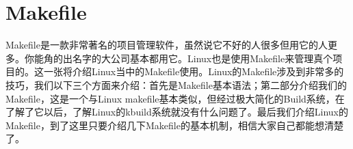 \chapter{Makefile}
Makefile是一款非常著名的项目管理软件，虽然说它不好的人很多但用它的人更多。你能角的出名字的大公司基本都用它。Linux也是使用Makefile来管理真个项目的。这一张将介绍Linux当中的Makefile使用。Linux的Makefile涉及到非常多的技巧，我们以下三个方面来介绍：首先是Makefile基本语法；第二部分介绍我们的Makefile，这是一个与Linux makefile基本类似，但经过极大简化的Build系统，在了解了它以后，了解Linux的kbuild系统就没有什么问题了。最后我们介绍Linux的Makefile，到了这里只要介绍几下Makefile的基本机制，相信大家自己都能想清楚了。





